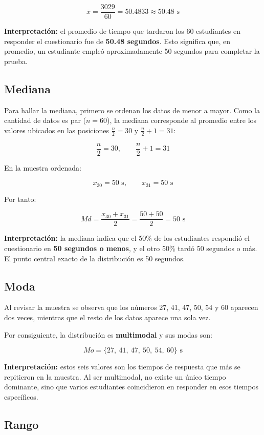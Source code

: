 \documentclass[12pt,letterpaper]{article}
\begin{document}
\[
\bar{x}=\frac{3029}{60}=50.4833 \approx 50.48 \text{ s}
\]

\textbf{Interpretación:} el promedio de tiempo que tardaron los 60 estudiantes en responder el cuestionario fue de \textbf{50.48 segundos}. Esto significa que, en promedio, un estudiante empleó aproximadamente 50 segundos para completar la prueba.

\subsection{Mediana}

Para hallar la mediana, primero se ordenan los datos de menor a mayor. Como la cantidad de datos es par ($n=60$), la mediana corresponde al promedio entre los valores ubicados en las posiciones $\frac{n}{2} = 30$ y $\frac{n}{2}+1 = 31$:

\[
\frac{n}{2}=30, \qquad \frac{n}{2}+1=31
\]

En la muestra ordenada:

\[
x_{30}=50 \text{ s},\qquad x_{31}=50 \text{ s}
\]

Por tanto:

\[
Md=\frac{x_{30}+x_{31}}{2}=\frac{50+50}{2}=50 \text{ s}
\]

\textbf{Interpretación:} la mediana indica que el 50\% de los estudiantes respondió el cuestionario en \textbf{50 segundos o menos}, y el otro 50\% tardó 50 segundos o más. El punto central exacto de la distribución es 50 segundos.

\subsection{Moda}

Al revisar la muestra se observa que los números 27, 41, 47, 50, 54 y 60 aparecen dos veces, mientras que el resto de los datos aparece una sola vez.

Por consiguiente, la distribución es \textbf{multimodal} y sus modas son:

\[
Mo=\{27,\ 41,\ 47,\ 50,\ 54,\ 60\} \text{ s}
\]

\textbf{Interpretación:} estos seis valores son los tiempos de respuesta que más se repitieron en la muestra. Al ser multimodal, no existe un único tiempo dominante, sino que varios estudiantes coincidieron en responder en esos tiempos específicos.

\subsection{Rango}
\end{document}

